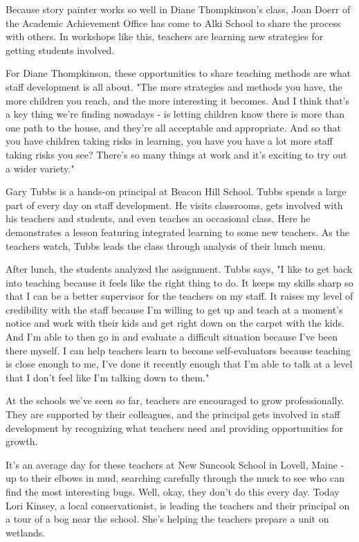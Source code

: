 Because story painter works so well in Diane Thompkinson's class, Joan Doerr of the Academic Achievement Office has come to Alki School to share the process with others.
In workshops like this, teachers are learning new strategies for getting students involved.

For Diane Thompkinson, these opportunities to share teaching methods are what staff development is all about.
"The more strategies and methods you have, the more children you reach, and the more interesting it becomes.
And I think that's a key thing we're finding nowadays - is letting children know there is more than one path to the house, and they're all acceptable and appropriate.
And so that you have children taking risks in learning, you have you have a lot more staff taking risks you see?
There's so many things at work and it's exciting to try out a wider variety."

Gary Tubbs is a hands-on principal at Beacon Hill School.
Tubbs spends a large part of every day on staff development.
He visits classrooms, gets involved with his teachers and students, and even teaches an occasional class.
Here he demonstrates a lesson featuring integrated learning to some new teachers.
As the teachers watch, Tubbs leads the class through analysis of their lunch menu.

After lunch, the students analyzed the assignment.
Tubbs says, "I like to get back into teaching because it feels like the right thing to do.
It keeps my skills sharp so that I can be a better supervisor for the teachers on my staff.
It raises my level of credibility with the staff because I'm willing to get up and teach at a moment's notice and work with their kids and get right down on the carpet with the kids.
And I'm able to then go in and evaluate a difficult situation because I've been there myself.
I can help teachers learn to become self-evaluators because teaching is close enough to me, I've done it recently enough that I'm able to talk at a level that I don't feel like I'm talking down to them."

At the schools we've seen so far, teachers are encouraged to grow professionally.
They are supported by their colleagues, and the principal gets involved in staff development by recognizing what teachers need and providing opportunities for growth.

It's an average day for these teachers at New Suncook School in Lovell, Maine - up to their elbows in mud, searching carefully through the muck to see who can find the most interesting bugs.
Well, okay, they don't do this every day.
Today Lori Kinsey, a local conservationist, is leading the teachers and their principal on a tour of a bog near the school.
She's helping the teachers prepare a unit on wetlands.

